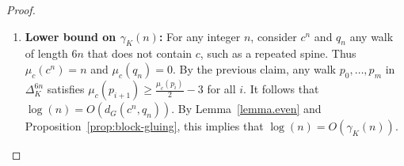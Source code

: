 \documentclass{article}
\begin{document}
\begin{proof}
\begin{enumerate}
In the leftmost case ($p_k= q_{k-1}$), we see that $p_{\llbracket k, 6n\rrbracket}= q_{\llbracket k,6n\rrbracket-1} $.
Similarly, in the center case, ($p_k= q_{k+1}$), we have $p_{\llbracket 0, k\rrbracket}= q_{\llbracket 0, k\rrbracket+1}$.
Finally, in the rightmost case ($p_k\notin\{q_{k-1}, q_{k+1}\}$), we can see that $p_{\llbracket 0, k-2\rrbracket}= q_{\llbracket 0, k-2\rrbracket +1}$ or $p_{\llbracket k+2, 6n\rrbracket}= q_{\llbracket k+2,6n\rrbracket-1}$.

Therefore:
\begin{itemize}
\item if for any $k$, $p_k\notin\{q_{k-1}, q_{k+1}\}$, we are in case (a).
\item if $p_k= q_{k+1}$ for all $k$, we are in case (b) or (c); similarly if $p_k= q_{k-1}$.
\item we cannot have $p_k = q_{k-1}$ and $p_{k+1} = q_{k+2}$ since $q_{k-1}$ and $q_{k+2}$ are not neighbours in the graph.
\end{itemize}


\textbf{(iii) Lower bound on $\mu_c(p)$ for $p$ a neighbor of $c^n$ in $\Delta_K^{6n}$:}

If $u$ is a prefix or suffix of $c^n$, it is clear that $\mu_c(u) \ge\lfloor \frac{l(u)}{6} \rfloor$. Furthermore, for any walk $p'$, $\mu_c(p') \ge \mu_c(p'')-1$ for any shift $p''$ of $p'$.

As a consequence of point \textbf{(ii)}, any neighbor $p$ of $c^n$ in $\Delta_K^{6n}$ has a subword which is a shift of a prefix or suffix of $c^n$ and whose length is at least $\frac{6n-3}{2}$. Thus we have that 
\[\mu_c(p) \ge \left\lfloor\frac{1}{6} \frac{6n-3}{2} - 1\right\rfloor \ge\frac{n}{2} - 3.\]

\textbf{(iv) Proof of the claim:} Let us consider $p$ and $q$ two words which are neighbors in $\Delta_K^{N}$. By definition, if $n=\mu_c(p)$, then 
$p$ has $c^n$ as a subword. The corresponding subword of $q$ is a neighbour of $c^n$ in $\Delta_K^{6n}$, which means that $\mu_c (q) \ge \frac{n}{2} - 3 = \frac{\mu_c(p)}{2}-3$.

\item \textbf{Lower bound on $\gamma_K(n)$:} For any integer $n$, consider $c^n$ and $q_n$ any walk of length $6n$ that does not contain $c$, such as a repeated spine. Thus $\mu_c(c^n) = n$ and $\mu_c(q_n) = 0$.
By the previous claim, any walk $p_0, \dots, p_m$ in $\Delta_K^{6n}$ satisfies $\mu_c (p_{i+1}) \ge \frac{\mu_c(p_i)}{2}-3$ for all $i$.
It follows that $\log(n) = O(d_G(c^n, q_n))$. By Lemma~\ref{lemma.even} and Proposition~\ref{prop:block-gluing}, this implies that $\log(n) = O(\gamma_K(n))$.\qedhere


\end{enumerate}
\end{proof}
\end{document}
